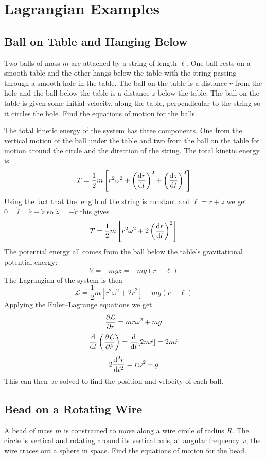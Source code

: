 \documentclass{article}
\newcommand{\LL}{\mathcal{L}}
\begin{document}
    \section{Lagrangian Examples}
    \subsection{Ball on Table and Hanging Below}
    Two balls of mass \(m\) are attached by a string of length \(\ell\).
    One ball rests on a smooth table and the other hangs below the table with the string passing through a smooth hole in the table.
    The ball on the table is a distance \(r\) from the hole and the ball below the table is a distance \(z\) below the table.
    The ball on the table is given some initial velocity, along the table, perpendicular to the string so it circles the hole.
    Find the equations of motion for the balls.
    
    The total kinetic energy of the system has three components.
    One from the vertical motion of the ball under the table and two from the ball on the table for motion around the circle and the direction of the string.
    The total kinetic energy is
    \[T = \frac{1}{2}m\left[r^2\omega^2 + \left(\dv{r}{t}\right)^2 + \left(\dv{z}{t}\right)^2\right]\]
    Using the fact that the length of the string is constant and \(\ell = r + z\) we get \(0 = \dot l = \dot r + \dot z\) so \(\dot z = -\dot r\) this gives
    \[T = \frac{1}{2}m\left[r^2\omega^2 + 2\left(\dv{r}{t}\right)^2\right]\]
    The potential energy all comes from the ball below the table's gravitational potential energy:
    \[V = -mgz = -mg(r - \ell)\]
    The Lagrangian of the system is then
    \[\LL = \frac{1}{2}m[r^2\omega^2 + 2\dot r^2] + mg(r - \ell)\]
    Applying the Euler--Lagrange equations we get
    \[\pdv{\LL}{r} = mr\omega^2 + mg\]
    \[\dv{t}\left(\pdv{\LL}{\dot r}\right) = \dv{t}[2m\dot r] = 2m\ddot r\]
    \[2\dv[2]{r}{t} = r\omega^2 - g\]
    This can then be solved to find the position and velocity of each ball.
    
    \subsection{Bead on a Rotating Wire}
    A bead of mass \(m\) is constrained to move along a wire circle of radius \(R\).
    The circle is vertical and rotating around its vertical axis, at angular frequency \(\omega\), the wire traces out a sphere in space.
    Find the equations of motion for the bead.
    
\end{document}
